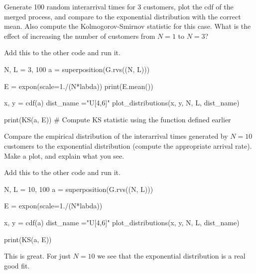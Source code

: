 \documentclass{scrartcl}
\begin{document}
\begin{exercise}
  Generate 100 random interarrival times for 3 customers, plot the cdf of the merged process, and compare to the exponential distribution with the correct mean. Also compute the Kolmogorov-Smirnov statistic for this case. What is the effect of increasing the number of customers from $N=1$ to $N=3$?
\begin{solution}
Add this to the other code and run it. 
\begin{pyverbatim}
N, L = 3, 100
a = superposition(G.rvs((N, L)))

E = expon(scale=1./(N*labda))
print(E.mean())

x, y = cdf(a)
dist_name ="U[4,6]"
plot_distributions(x, y, N, L, dist_name)

print(KS(a, E)) # Compute KS statistic using the function defined earlier
\end{pyverbatim}

\end{solution}
\end{exercise}


\begin{exercise}
  Compare  the empirical distribution of the interarrival times generated by  $N=10$ customers to the exponential distribution (compute the appropriate arrival rate). Make a plot, and explain what you see.
\begin{solution}
Add this to the other code and run it. 
\begin{pyverbatim}
N, L = 10, 100
a = superposition(G.rvs((N, L)))

E = expon(scale=1./(N*labda))

x, y = cdf(a)
dist_name ="U[4,6]"
plot_distributions(x, y, N, L, dist_name)

print(KS(a, E)) 
\end{pyverbatim}

This is great. For just $N=10$ we see that the exponential distribution is a real good fit. 
\end{solution}
\end{exercise}
\end{document}
